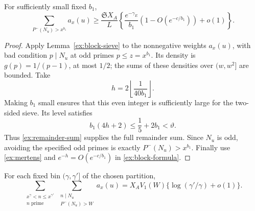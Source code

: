\begin{lemma}\label{ex:presieve}
For sufficiently small fixed $b_1$,
\begin{equation}\label{ex:presieve-bound}
 \sum_{P^-(N_u)>x^{b_1}}a_x(u)
 \ge\frac{\mathfrak S X_A}{L}
       \left\{\frac{e^{-\gamma_E}}{b_1}
                    (1-O(e^{-c/b_1}))+o(1)\right\}.
\end{equation}
\end{lemma}

\begin{proof}
Apply Lemma~\ref{ex:block-sieve} to the nonnegative weights
$a_x(u)$, with bad condition $p\mid N_u$ at odd primes
$p\le z=x^{b_1}$. Its density is $g(p)=1/(p-1)$, at most $1/2$;
the sums of these densities over $(w,w^2]$ are bounded. Take
\[
 h=2\left\lfloor\frac1{40b_1}\right\rfloor.
\]
Making $b_1$ small ensures that this even integer is sufficiently
large for the two-sided sieve. Its level satisfies
\[
 b_1(4h+2)\le\frac15+2b_1<\vartheta.
\]
Thus \eqref{ex:remainder-sum} supplies the full remainder sum.
Since $N_u$ is odd, avoiding the specified odd primes is exactly
$P^-(N_u)>x^{b_1}$. Finally use \eqref{ex:mertens} and
$e^{-h}=O(e^{-c/b_1})$ in \eqref{ex:block-formula}.
\end{proof}

\begin{lemma}\label{ex:conditional}
For each fixed bin $(\gamma,\gamma']$ of the chosen partition,
\begin{equation}\label{ex:conditional-sieve}
 \sum_{\substack{x^\gamma<n\le x^{\gamma'}\\n\text{ prime}}}
       \sum_{\substack{n\mid N_u\\P^-(N_u)>W}}a_x(u)
 =X_AV_1(W)\{\log(\gamma'/\gamma)+o(1)\}.
\end{equation}
\end{lemma}

